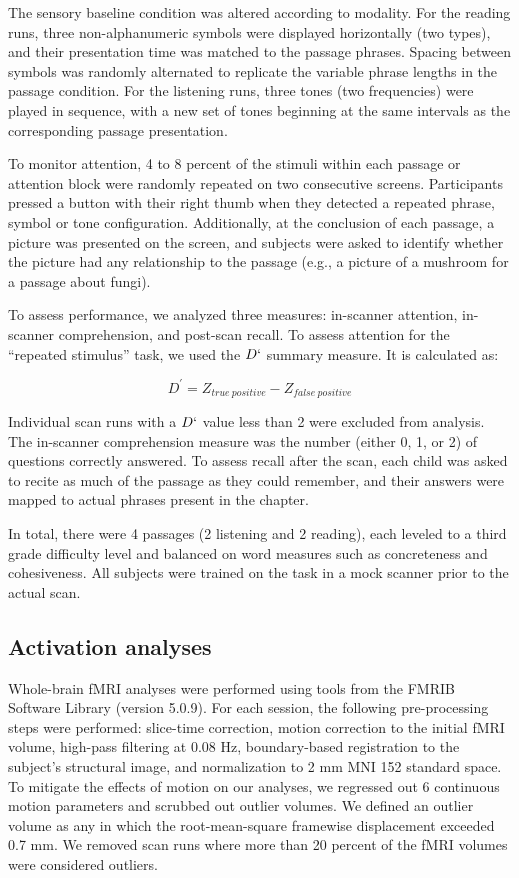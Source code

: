 The sensory baseline condition was altered according to modality. For the reading runs, three non-alphanumeric symbols were displayed horizontally (two types), and their presentation time was matched to the passage phrases. Spacing between symbols was randomly alternated to replicate the variable phrase lengths in the passage condition. For the listening runs, three tones (two frequencies) were played in sequence, with a new set of tones beginning at the same intervals as the corresponding passage presentation. 

To monitor attention, 4 to 8 percent of the stimuli within each passage or attention block were randomly repeated on two consecutive screens.  Participants pressed a button with their right thumb when they detected a repeated phrase, symbol or tone configuration. Additionally, at the conclusion of each passage, a picture was presented on the screen, and subjects were asked to identify whether the picture had any relationship to the passage (e.g., a picture of a mushroom for a passage about fungi). 

To assess performance, we analyzed three measures: in-scanner attention, in-scanner comprehension, and post-scan recall. To assess attention for the ``repeated stimulus'' task, we used the $D`$ summary measure. It is calculated as:

$$
D^\prime = Z_{true\ positive} - Z_{false\ positive}
$$

Individual scan runs with a $D`$ value less than 2 were excluded from analysis. The in-scanner comprehension measure was the number (either 0, 1, or 2) of questions correctly answered. To assess recall after the scan, each child was asked to recite as much of the passage as they could remember, and their answers were mapped to actual phrases present in the chapter. 

In total, there were 4 passages (2 listening and 2 reading), each leveled to a third grade difficulty level and balanced on word measures such as concreteness and cohesiveness.  All subjects were trained on the task in a mock scanner prior to the actual scan. 


\subsection{Activation analyses}

Whole-brain fMRI analyses were performed using tools from the FMRIB Software Library (version 5.0.9). For each session, the following pre-processing steps were performed:  slice-time correction, motion correction to the initial fMRI volume, high-pass filtering at 0.08 Hz, boundary-based registration to the subject's structural image, and normalization to 2 mm MNI 152 standard space. To mitigate the effects of motion on our analyses, we regressed out 6 continuous motion parameters and scrubbed out outlier volumes. We defined an outlier volume as any in which the root-mean-square framewise displacement exceeded 0.7 mm. We removed scan runs where more than 20 percent of the fMRI volumes were considered outliers.

